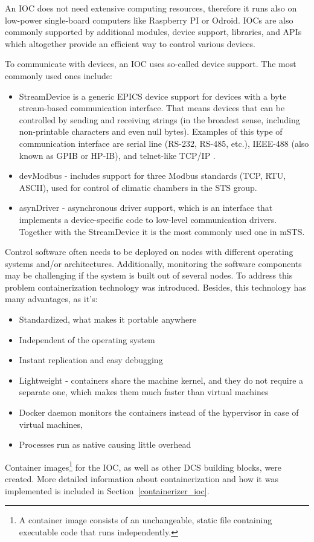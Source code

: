 An \gls{IOC} does not need extensive computing resources, therefore it runs also on low-power single-board computers like Raspberry PI or Odroid. 
 \glspl{IOC} are also commonly supported by additional modules, device support, libraries, and \glspl{API} which altogether provide an efficient way to control various devices.

 
To communicate with devices, an \gls{IOC} uses so-called device support. The most commonly used ones include:
\begin{itemize}
    \item StreamDevice is a generic EPICS device support for devices with a byte stream-based communication interface. That means devices that can be controlled by sending and receiving strings (in the broadest sense, including non-printable characters and even null bytes). Examples of this type of communication interface are serial line (RS-232, RS-485, etc.), IEEE-488 (also known as GPIB or HP-IB), and telnet-like TCP/IP \cite{StreamDevice}.
    \item devModbus \cite{modbus} - includes support for three Modbus standards (TCP, RTU, ASCII), used for control of climatic chambers in the \gls{STS} group.
    \item asynDriver \cite{asyn} - asynchronous driver support, which is an interface that implements a device-specific code to low-level communication drivers. Together with the StreamDevice it is the most commonly used one in \gls{mSTS}. 
\end{itemize}

Control software often needs to be deployed on nodes with different operating systems and/or architectures. Additionally, monitoring the software components may be challenging if the system is built out of several nodes. To address this problem containerization technology was introduced. Besides, this technology has many advantages, as it's:
\begin{itemize}
    \item Standardized, what makes it portable anywhere
    \item Independent of the operating system
    \item Instant replication and easy debugging
    \item Lightweight - containers share the machine kernel, and they do not require a separate one, which makes them much faster than virtual machines
    \item Docker daemon monitors the containers instead of the hypervisor in case of virtual machines,
    \item Processes run as native causing little overhead
\end{itemize}

Container images\footnote{A container image consists of an unchangeable, static file containing executable code that runs independently.} for the \gls{IOC}, as well as other \gls{DCS} building blocks, were created. More detailed information about containerization and how it was implemented is included in Section~\ref{containerizer_ioc}.
 
